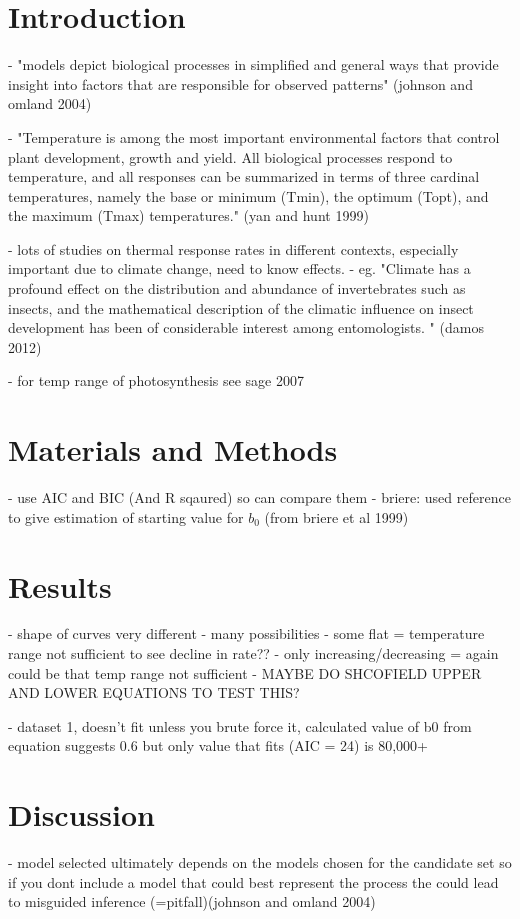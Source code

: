 \documentclass[12pt]{article}
\begin{document}
\section{Introduction}
	- "models depict biological processes in simplified and general ways that provide insight into factors that are responsible for observed patterns" (johnson and omland 2004)
	
	- "Temperature is among the most important environmental factors that control plant development, growth and yield. All biological processes respond to temperature, and all responses can be summarized in terms of three cardinal temperatures, namely the base or minimum (Tmin), the optimum (Topt), and the maximum (Tmax) temperatures." (yan and hunt 1999)
	
	- lots of studies on thermal response rates in different contexts, especially important due to climate change, need to know effects.
	- eg. "Climate has a profound effect on the distribution and abundance of invertebrates such as insects, and the mathematical description of the climatic influence on insect development has been of considerable interest among entomologists. " (damos 2012)
	
	- for temp range of photosynthesis see sage 2007
\section{Materials and Methods}
	- use AIC and BIC (And R sqaured) so can compare them
	- briere: used reference to give estimation of starting value for $b_0$ (from briere et al 1999)

\section{Results}
- shape of curves very different - many possibilities
- some flat = temperature range not sufficient to see decline in rate??
- only increasing/decreasing = again could be that temp range not sufficient - MAYBE DO SHCOFIELD UPPER AND LOWER EQUATIONS TO TEST THIS?

- dataset 1, doesn't fit unless you brute force it, calculated value of b0 from equation suggests 0.6 but only value that fits (AIC = 24) is 80,000+
\section{Discussion}

- model selected ultimately depends on the models chosen for the candidate set so if you dont include a model that could best represent the process the could lead to misguided inference (=pitfall)(johnson and omland 2004)
\end{document}
